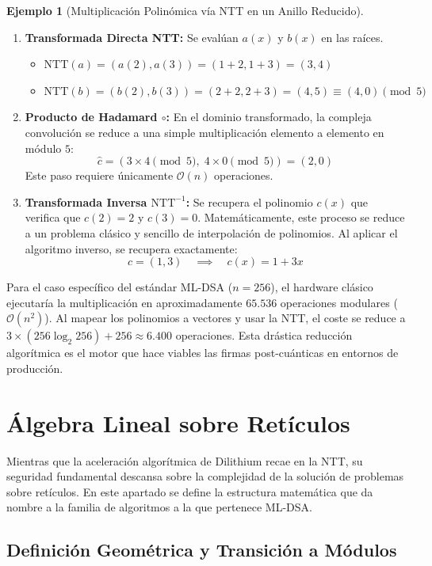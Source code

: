 \documentclass[11pt, a4paper]{report}
\theoremstyle{definition}
\newtheorem{ejemplo}{Ejemplo}[chapter]
\begin{document}
\begin{ejemplo}[Multiplicación Polinómica vía NTT en un Anillo Reducido]
\begin{enumerate}
    \item \textbf{Transformada Directa NTT:} Se evalúan $a(x)$ y $b(x)$ en las raíces.
    \begin{itemize}
        \item $\text{NTT}(a) = (a(2), a(3)) = (1+2, 1+3) = (3, 4)$
        \item $\text{NTT}(b) = (b(2), b(3)) = (2+2, 2+3) = (4, 5) \equiv (4, 0) \pmod{5}$
    \end{itemize}
    \item \textbf{Producto de Hadamard $\circ$:} En el dominio transformado, la compleja convolución se reduce a una simple multiplicación elemento a elemento en módulo $5$:
    \[\hat{c} = (3 \times 4 \pmod{5},\; 4 \times 0 \pmod{5}) = (2, 0)\]
    Este paso requiere únicamente $\mathcal{O}(n)$ operaciones.
    \item \textbf{Transformada Inversa $\text{NTT}^{-1}$:} Se recupera el polinomio $c(x)$ que verifica que $c(2)=2$ y $c(3)=0$. Matemáticamente, este proceso se reduce a un problema clásico y sencillo de interpolación de polinomios. Al aplicar el algoritmo inverso, se recupera exactamente:
    \[c = (1, 3) \quad \implies \quad c(x) = 1 + 3x\]
\end{enumerate}
\end{ejemplo}

Para el caso específico del estándar ML-DSA ($n=256$), el hardware clásico ejecutaría la multiplicación en aproximadamente $65.536$ operaciones modulares ($\mathcal{O}(n^2)$). Al mapear los polinomios a vectores y usar la NTT, el coste se reduce a $3 \times (256 \log_2 256) + 256 \approx 6.400$ operaciones. Esta drástica reducción algorítmica es el motor que hace viables las firmas post-cuánticas en entornos de producción.

\section{Álgebra Lineal sobre Retículos}

Mientras que la aceleración algorítmica de Dilithium recae en la NTT, su seguridad fundamental descansa sobre la complejidad de la solución de problemas sobre retículos. En este apartado se define la estructura matemática que da nombre a la familia de algoritmos a la que pertenece ML-DSA.

\subsection{Definición Geométrica y Transición a Módulos}
\end{document}
